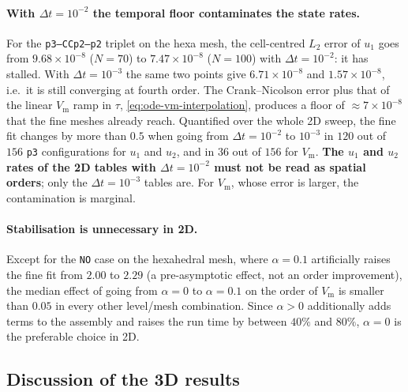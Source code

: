 \documentclass[11pt,a4paper]{article}
\newcommand{\code}[1]{\texttt{\small #1}}
\newcommand{\Vm}{V_{\text{m}}}
\begin{document}
\paragraph{With $\Delta t=10^{-2}$ the temporal floor contaminates the state
rates.}
For the \code{p3--CCp2--p2} triplet on the hexa mesh, the cell-centred $L_2$
error of $u_1$ goes from $9.68\times10^{-8}$ ($N=70$) to $7.47\times10^{-8}$
($N=100$) with $\Delta t=10^{-2}$: it has stalled. With $\Delta t=10^{-3}$ the
same two points give $6.71\times10^{-8}$ and $1.57\times10^{-8}$, i.e.\ it is
still converging at fourth order. The Crank--Nicolson error plus that of the
linear $\Vm$ ramp in $\tau$, \eqref{eq:ode-vm-interpolation}, produces a floor of
$\approx7\times10^{-8}$ that the fine meshes already reach. Quantified over the
whole 2D sweep, the fine fit changes by more than $0.5$ when going from
$\Delta t=10^{-2}$ to $10^{-3}$ in $120$ out of $156$ \code{p3} configurations
for $u_1$ and $u_2$, and in $36$ out of $156$ for $\Vm$. \textbf{The $u_1$ and
$u_2$ rates of the 2D tables with $\Delta t=10^{-2}$ must not be read as spatial
orders}; only the $\Delta t=10^{-3}$ tables are. For $\Vm$, whose error is
larger, the contamination is marginal.

\paragraph{Stabilisation is unnecessary in 2D.}
Except for the \code{NO} case on the hexahedral mesh, where $\alpha=0.1$
artificially raises the fine fit from $2.00$ to $2.29$ (a pre-asymptotic effect,
not an order improvement), the median effect of going from $\alpha=0$ to
$\alpha=0.1$ on the order of $\Vm$ is smaller than $0.05$ in every other
level/mesh combination. Since $\alpha>0$ additionally adds terms to the assembly
and raises the run time by between $40\%$ and $80\%$, $\alpha=0$ is the
preferable choice in 2D.



\FloatBarrier

\subsection{Discussion of the 3D results}
\label{sec:en-conclusions-3d}
\end{document}
